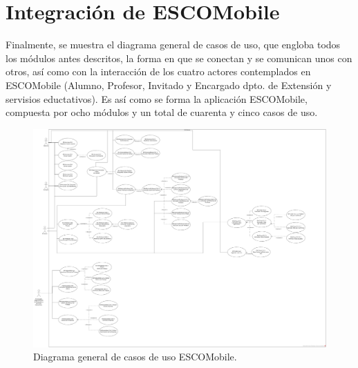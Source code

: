 \section{Integración de ESCOMobile}

\noindent
Finalmente, se muestra el diagrama general de casos de uso, que engloba todos los módulos antes descritos,
la forma en que se conectan y se comunican unos con otros, así como con la interacción de los cuatro actores 
contemplados en ESCOMobile (Alumno, Profesor, Invitado y Encargado dpto. de Extensión y servisios eductativos).
Es así como se forma la aplicación ESCOMobile, compuesta por ocho módulos y un total de cuarenta y cinco
casos de uso. 

\pagebreak
\begin{figure}[htbp!]
	\centering
	\includegraphics[width=1\textwidth]{images/casos/general}
	\caption{Diagrama general de casos de uso ESCOMobile.}
\end{figure}